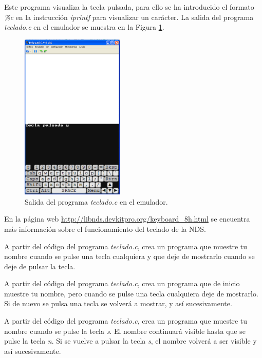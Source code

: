 Este programa visualiza la tecla pulsada, para ello se ha introducido el formato \textit{\%c} en la instrucción \textit{iprintf} para visualizar un carácter. La salida del programa \textit{teclado.c} en el emulador se muestra en la Figura \ref{fig_c3_teclado1}.

\begin{figure}[t]
\centering
\includegraphics[height=8cm]{Figuras/C3/c3_teclado1.png}
\caption{Salida del programa \textit{teclado.c} en el emulador.}
\label{fig_c3_teclado1}
\end{figure}

En la página web \url{http://libnds.devkitpro.org/keyboard_8h.html} se encuentra más información sobre el funcionamiento del teclado de la NDS.


\begin{exercise}
A partir del código del programa \textit{teclado.c}, crea un programa que muestre tu nombre cuando se pulse una tecla cualquiera y que deje de mostrarlo cuando se deje de pulsar la tecla.
\end{exercise}

\begin{exercise}
A partir del código del programa \textit{teclado.c}, crea un programa que de inicio muestre tu nombre, pero cuando se pulse una tecla cualquiera deje de mostrarlo. Si de nuevo se pulsa una tecla se volverá a mostrar, y así sucesivamente.
\end{exercise}

\begin{exercise}
A partir del código del programa \textit{teclado.c}, crea un programa que muestre tu nombre cuando se pulse la tecla \textit{s}. El nombre continuará visible hasta que se pulse la tecla \textit{n}. Si se vuelve a pulsar la tecla \textit{s}, el nombre volverá a ser visible y así sucesivamente.
\end{exercise}

